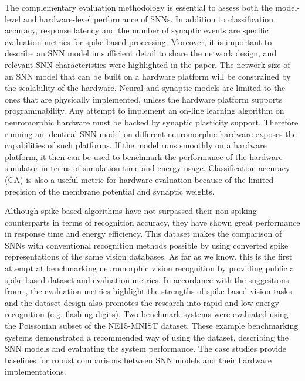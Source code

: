 \documentclass{frontiersENG} %
\begin{document}
The complementary evaluation methodology is essential to assess both the model-level and hardware-level performance of SNNs.
In addition to classification accuracy, response latency and the number of synaptic events are specific evaluation metrics for spike-based processing.
Moreover, it is important to describe an SNN model in sufficient detail to share the network design, and relevant SNN characteristics were highlighted in the paper.  
The network size of an SNN model that can be built on a hardware platform will be constrained by the scalability of the hardware.
Neural and synaptic models are limited to the ones that are physically implemented, unless the hardware platform supports programmability.
Any attempt to implement an on-line learning algorithm on neuromorphic hardware must be backed by synaptic plasticity support.
Therefore running an identical SNN model on different neuromorphic hardware exposes the capabilities of such platforms.
If the model runs smoothly on a hardware platform, it then can be used to benchmark the performance of the hardware simulator in terms of simulation time and energy usage.
Classification accuracy (CA) is also a useful metric for hardware evaluation because of the limited precision of the membrane potential and synaptic weights.

Although spike-based algorithms have not surpassed their non-spiking counterparts in terms of recognition accuracy, they have shown great performance in response time and energy efficiency.
This dataset makes the comparison of SNNs with conventional recognition methods possible by using converted spike representations of the same vision databases.
As far as we know, this is the first attempt at benchmarking neuromorphic vision recognition by providing public a spike-based dataset and evaluation metrics.
In accordance with the suggestions from~\cite{tan2015bench}, the evaluation metrics highlight the strengths of spike-based vision tasks and the dataset design also promotes the research into rapid and low energy recognition (e.g. flashing digits).
Two benchmark systems were evaluated using the Poissonian subset of the NE15-MNIST dataset.
These example benchmarking systems demonstrated a recommended way of using the dataset, describing the SNN models and evaluating the system performance.
The case studies provide baselines for robust comparisons between SNN models and their hardware implementations.
\end{document}

